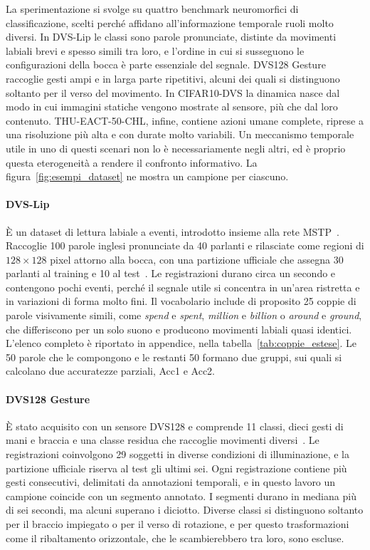 La sperimentazione si svolge su quattro benchmark neuromorfici di classificazione, scelti perché affidano all'informazione temporale ruoli molto diversi. In DVS-Lip le classi sono parole pronunciate, distinte da movimenti labiali brevi e spesso simili tra loro, e l'ordine in cui si susseguono le configurazioni della bocca è parte essenziale del segnale. DVS128 Gesture raccoglie gesti ampi e in larga parte ripetitivi, alcuni dei quali si distinguono soltanto per il verso del movimento. In CIFAR10-DVS la dinamica nasce dal modo in cui immagini statiche vengono mostrate al sensore, più che dal loro contenuto. THU-EACT-50-CHL, infine, contiene azioni umane complete, riprese a una risoluzione più alta e con durate molto variabili. Un meccanismo temporale utile in uno di questi scenari non lo è necessariamente negli altri, ed è proprio questa eterogeneità a rendere il confronto informativo. La figura~\ref{fig:esempi_dataset} ne mostra un campione per ciascuno.

\paragraph{DVS-Lip}
\label{subsec:dvslip}
È un dataset di lettura labiale a eventi, introdotto insieme alla rete MSTP~\cite{tan2022dvslip}. Raccoglie 100 parole inglesi pronunciate da 40 parlanti e rilasciate come regioni di $128\times128$ pixel attorno alla bocca, con una partizione ufficiale che assegna 30 parlanti al training e 10 al test~\cite{tan2022dvslip}. Le registrazioni durano circa un secondo e contengono pochi eventi, perché il segnale utile si concentra in un'area ristretta e in variazioni di forma molto fini. Il vocabolario include di proposito 25 coppie di parole visivamente simili, come \emph{spend} e \emph{spent}, \emph{million} e \emph{billion} o \emph{around} e \emph{ground}, che differiscono per un solo suono e producono movimenti labiali quasi identici. L'elenco completo è riportato in appendice, nella tabella~\ref{tab:coppie_estese}. Le 50 parole che le compongono e le restanti 50 formano due gruppi, sui quali si calcolano due accuratezze parziali, Acc1 e Acc2.

\paragraph{DVS128 Gesture}
\label{subsec:dvsgesture}
È stato acquisito con un sensore DVS128 e comprende 11 classi, dieci gesti di mani e braccia e una classe residua che raccoglie movimenti diversi~\cite{amir2017dvsgesture}. Le registrazioni coinvolgono 29 soggetti in diverse condizioni di illuminazione, e la partizione ufficiale riserva al test gli ultimi sei. Ogni registrazione contiene più gesti consecutivi, delimitati da annotazioni temporali, e in questo lavoro un campione coincide con un segmento annotato. I segmenti durano in mediana più di sei secondi, ma alcuni superano i diciotto. Diverse classi si distinguono soltanto per il braccio impiegato o per il verso di rotazione, e per questo trasformazioni come il ribaltamento orizzontale, che le scambierebbero tra loro, sono escluse.

